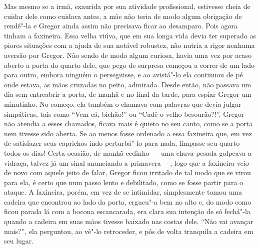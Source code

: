 Mas mesmo se a irmã, exaurida por sua atividade profissional, estivesse
cheia de cuidar dele como cuidava antes, a mãe não teria de modo algum
obrigação de rendê"-la e Gregor ainda assim não precisava ficar ao
desamparo. Pois agora tinham a faxineira. Essa velha viúva, que em sua
longa vida devia ter superado as piores situações com a ajuda de sua
notável robustez, não nutria a rigor nenhuma aversão por Gregor. Não sendo
de modo algum curiosa, havia uma vez por acaso aberto a porta do quarto
dele, que pego de surpresa começou a correr de um lado para outro, embora
ninguém o perseguisse, e ao avistá"-lo ela continuou de pé onde estava, as
mãos cruzadas no peito, admirada. Desde então, não passava um dia sem
entreabrir a porta, de manhã e no final da tarde, para espiar Gregor um
minutinho. No começo, ela também o chamava com palavras que devia julgar
simpáticas, tais como “Vem cá, bichão!” ou “Cadê o velho besourão?!”.
Gregor não atendia a esses chamados, ficava mais é quieto no seu canto,
como se a porta nem tivesse sido aberta. Se ao menos fosse ordenado a essa
faxineira que, em vez de satisfazer seus caprichos indo perturbá"-lo para
nada, limpasse seu quarto todos os dias! Certa ocasião, de manhã cedinho ---
uma chuva pesada golpeava a vidraça, talvez já um sinal anunciando a
primavera ---, logo que a faxineira veio de novo com aquele jeito de falar,
Gregor ficou irritado de tal modo que se virou para ela, é certo que num
passo lento e debilitado, como se fosse partir para o ataque. A faxineira,
porém, em vez de se intimidar, simplesmente tomou uma cadeira que
encontrou ao lado da porta, ergueu"-a bem no alto e, do modo como ficou
parada lá com a bocona escancarada, era clara sua intenção de só fechá"-la
quando a cadeira em suas mãos tivesse baixado nas costas dele. “Não vai
avançar mais?”, ela perguntou, ao vê"-lo retroceder, e pôs de volta
tranquila a cadeira em seu lugar.

